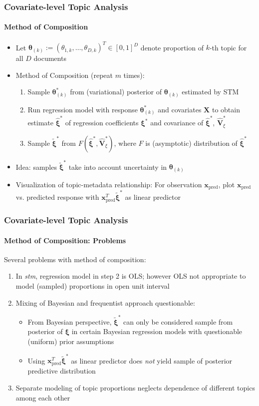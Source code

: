 \documentclass[xcolor=dvipsnames]{beamer}
\begin{document}
\begin{frame}
\frametitle{Covariate-level Topic Analysis}
\framesubtitle{Method of Composition}
\begin{itemize}
\item Let $\boldsymbol{\theta}_{(k)}:=(\theta_{1,k}, \dots, \theta_{D,k})^T \in [0,1]^{D}$ denote proportion of $k$-th topic for all $D$ documents
\item Method of Composition (repeat $m$ times):
\begin{enumerate}
\item Sample $\boldsymbol{\theta}^*_{(k)}$ from (variational) posterior of $\boldsymbol{\theta}_{(k)}$ estimated by STM
\item Run regression model with response $\boldsymbol{\theta}^*_{(k)}$ and covariates $\boldsymbol{X}$ to obtain estimate $\hat{\boldsymbol{\xi}}^*$ of regression coefficients $\boldsymbol{\xi}^*$ and covariance of $\hat{\boldsymbol{\xi}}^*$, $\hat{\boldsymbol{V}}^*_{\xi}$
\item Sample $\tilde{\boldsymbol{\xi}}^*$ from $F(\hat{\boldsymbol{\xi}}^*, \hat{\boldsymbol{V}}^*_{\xi})$, where $F$ is (asymptotic) distribution of $\hat{\boldsymbol{\xi}}^*$
\end{enumerate}
\item Idea: samples $\tilde{\boldsymbol{\xi}}^*$ take into account uncertainty in $\boldsymbol{\theta}_{(k)}$
\item Visualization of topic-metadata relationship: For observation $\boldsymbol{x}_{\text{pred}}$, plot $\boldsymbol{x}_{\text{pred}}$ vs. predicted response with $\boldsymbol{x}_{\text{pred}}^T \tilde{\boldsymbol{\xi}}^*$ as linear predictor
\end{itemize}
\end{frame}

\begin{frame}
\frametitle{Covariate-level Topic Analysis}
\framesubtitle{Method of Composition: Problems}
Several problems with method of composition:
\begin{enumerate}
\item In \textit{stm}, regression model in step 2 is OLS; however OLS not appropriate to model (sampled) proportions in open unit interval
\item Mixing of Bayesian and frequentist approach questionable:
\begin{itemize}
\item From Bayesian perspective, $\tilde{\boldsymbol{\xi}}^*$ can only be considered sample from posterior of $\boldsymbol{\xi}$ in certain Bayesian regression models with questionable (uniform) prior assumptions
\item Using $\boldsymbol{x}_{\text{pred}}^T \tilde{\boldsymbol{\xi}}^*$  as linear predictor does \textit{not} yield sample of posterior predictive distribution
\end{itemize}
\item Separate modeling of topic proportions neglects dependence of different topics among each other
\end{enumerate}
\end{frame}
\end{document}
